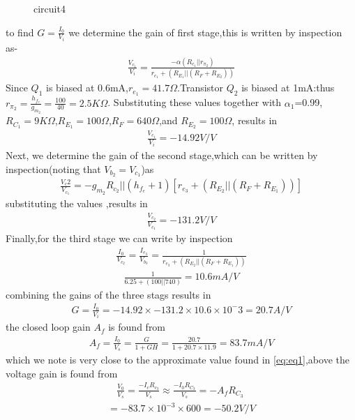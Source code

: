 \begin{enumerate}[label=\thesubsection.\arabic*.,ref=\thesubsection.\theenumi]
\begin{figure}[!ht]
\begin{center}
		\resizebox{\columnwidth}{!}{}
	\end{center}
\caption{circuit4}
\label{fig:circuit4}
\end{figure}
to find $G=\frac{I_0}{V_i}$ we determine the gain of first stage,this is written by inspection as-
\begin{align}
    \frac{V_c_1}{V_i}=\frac{-\alpha(R_c_1||r_\pi_2)}{r_e_1+(R_E_1||(R_F+R_E_2))}
\end{align}
Since $Q_1$ is biased at 0.6mA,$r_e_1=41.7\Omega$.Transistor $Q_2$ is biased at 1mA:thus $r_\pi_2=\frac{h_f_e}{g_m_2}=\frac{100}{40}=2.5K\Omega$. Substituting these values together with $\alpha_1$=0.99,$R_C_1=9K\Omega$,$R_E_1=100\Omega$,$R_F=640\Omega$,and $R_E_2=100\Omega$, results in 
\begin{align}
   \frac{V_c_1}{V_i}=-14.92V/V 
\end{align}
Next, we determine the gain of the second stage,which can be written by inspection(noting that $V_b_2=V_c_1$)as
\begin{align}
    \frac{V_c2}{V_c_1}=-g_m_2{R_c_2||(h_f_e+1)[r_e_3+(R_E_2||(R_F+R_E_1))]}
\end{align}
substituting the values ,results in 
\begin{align}
    \frac{V_c_2}{V_c_1}=-131.2 V/V
\end{align}
Finally,for the third stage we can write by inspection
\begin{align}
    \frac{I_0}{V_c_2}=\frac{I_e_3}{V_b_3}=\frac{1}{r_e_3+(R_E_2||(R_F+R_E_1))}
\end{align}
\begin{align}
    \frac{1}{6.25+(100||740)}=10.6mA/V
\end{align}
combining the gains of the three stags results in
\begin{align}
G=\frac{I_0}{V_i}=-14.92\times-131.2\times10.6\times10^-3=20.7A/V    
\end{align}
the closed loop gain $A_f$ is found from
\begin{align}
    A_f=\frac{I_0}{V_s}=\frac{G}{1+GH}=\frac{20.7}{1+20.7\times11.9}=83.7mA/V
\end{align}
which we note is very close to the approximate value found in \eqref{eq:eq1},above
the voltage gain is found from 
\begin{align}
    \frac{V_0}{V_s}=\frac{-I_cR_c_3}{V_s}\approx\frac{-I_0R_C_3}{V_s}=-A_fR_C_3
    \
\end{align}
\begin{align}
    =-83.7\times10^{-3}\times600=-50.2V/V

\end{align}
\end{enumerate}
